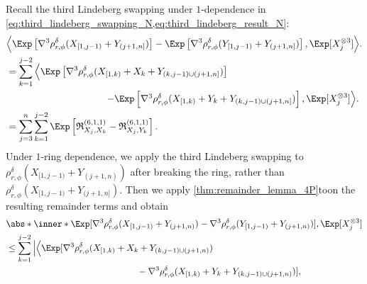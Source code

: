 \documentclass[aos]{imsart}
\begin{document}
\begin{appendix}
\medskip
{} Recall the third Lindeberg swapping under $1$-dependence in \cref{eq:third_lindeberg_swapping_N,eq:third_lindeberg_result_N}: 
\begin{equation*}
\begin{aligned}
    & \Big\langle 
        \Exp\left[ \nabla^3 \rho_{r,\phi}^\delta(X_{[1,j-1)} + Y_{(j+1,n]}) \right] 
    - \Exp\left[ \nabla^3  \rho_{r,\phi}^\delta(Y_{[1,j-1)} + Y_{(j+1,n]}) \right], \Exp[ X_j^{\otimes 3} ]\Big\rangle. \\
    & = \sum_{k=1}^{j-2} \Big\langle
        \Exp\left[ \nabla^3 \rho_{r,\phi}^\delta(X_{[1,k)} + X_k + Y_{(k,j-1) \cup (j+1,n]}) \right] \\ 
    & \omit{\hfill $- \Exp\left[ \nabla^3   \rho_{r,\phi}^\delta(X_{[1,k)} + Y_k + Y_{(k,j-1) \cup (j+1,n]}) \right], 
        \Exp[ X_j^{\otimes 3} ]
    \Big\rangle.$} \\
    & = \sum_{j=3}^{n} \sum_{k=1}^{j-2} \Exp \left[ 
        \mathfrak{R}_{X_j,X_k}^{(6,1,1)}
        - \mathfrak{R}_{X_j,Y_k}^{(6,1,1)}
    \right]. \\
\end{aligned}
\end{equation*}
Under $1$-ring dependence, we apply the third Lindeberg swapping to $\rho_{r,\phi}^{\delta}(X_{[1,j-1)} + Y_{(j+1,n)})$ after breaking the ring, rather than $\rho_{r,\phi}^{\delta}(X_{[1,j-1)} + Y_{(j+1,n]})$. Then we apply \cref{thm:remainder_lemma_4P}toon the resulting remainder terms and obtain
\begin{equation*}
\begin{aligned}
    & \abs*{\inner*{ 
        \Exp[\nabla^3 \rho_{r,\phi}^{\delta}(X_{[1,j-1)} + Y_{(j+1,n)})
        - \nabla^3 \rho_{r,\phi}^{\delta}(Y_{[1,j-1)} + Y_{(j+1,n)})], 
        \Exp[X_j^{\otimes 3}] }} \\
    & \leq \sum_{k=1}^{j-2} \Big| \Big\langle 
        \Exp[\nabla^3 \rho_{r,\phi}^{\delta}(X_{[1,k)} + X_k + Y_{(k,j-1)\cup(j+1,n)}) \\
    & \hspace{2in} - \nabla^3 \rho_{r,\phi}^{\delta}(X_{[1,k)} + Y_k + Y_{(k,j-1)\cup(j+1,n)})], 

\end{aligned}
\end{equation*}
\end{appendix}
\end{document}
